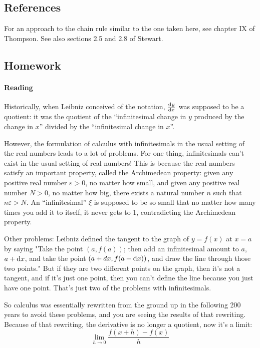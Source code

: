 \subsection{References}
For an approach to the chain rule similar to the one taken here, see chapter IX of Thompson. See also sections 2.5 and 2.8 of Stewart.

\subsection{Homework}
\paragraph{Reading}
Historically, when Leibniz conceived of the notation, $ \od{y}{x} $ was supposed to be a quotient: it was the quotient of the ``infinitesimal change in $y$ produced by the change in $x$'' divided by the ``infinitesimal change in $x$''.

However, the formulation of calculus with infinitesimals in the usual setting of the real numbers leads to a lot of problems. For one thing, infinitesimals can't exist in the usual setting of real numbers! This is because the real numbers satisfy an important property, called the Archimedean property: given any positive real number $ \varepsilon > 0 $, no matter how small, and given any positive real number $ N > 0 $, no matter how big, there exists a natural number $n$ such that $n \varepsilon > N$. An ``infinitesimal'' $ \xi $ is supposed to be so small that no matter how many times you add it to itself, it never gets to 1, contradicting the Archimedean property.

Other problems: Leibniz defined the tangent to the graph of $y=f(x)$ at $x=a$ by saying "Take the point $(a,f(a))$; then add an infinitesimal amount to $a$, $a+\dif{x}$, and take the point $(a+dx,f(a+\dif{x}))$, and draw the line through those two points." But if they are two different points on the graph, then it's not a tangent, and if it's just one point, then you can't define the line because you just have one point. That's just two of the problems with infinitesimals.

So calculus was essentially rewritten from the ground up in the following 200 years to avoid these problems, and you are seeing the results of that rewriting. Because of that rewriting, the derivative is no longer a quotient, now it's a limit:
\begin{displaymath}
  \lim_{h \to 0} \frac{f(x + h) - f(x)}{h}
\end{displaymath}

